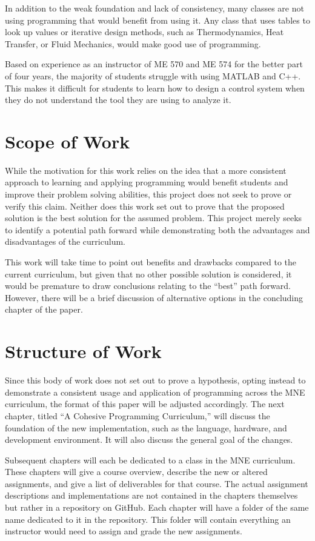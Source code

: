 In addition to the weak foundation and lack of consistency, many classes are not using
programming that would benefit from using it. Any class that uses tables to look up values
or iterative design methods, such as Thermodynamics, Heat Transfer, or Fluid Mechanics, 
would make good use of programming. 

Based on experience as an instructor of ME 570 and ME 574 for the better part of 
four years, the majority of students struggle with using MATLAB and C++. This makes it 
difficult for students to learn how to design a control system when they do not understand 
the tool they are using to analyze it.

\section{Scope of Work}

While the motivation for this work relies on the idea that a more consistent approach to
learning and applying programming would benefit students and improve their problem solving
abilities, this project does not seek to prove or verify this claim. Neither does this
work set out to prove that the proposed solution is the best solution for the assumed
problem. This project merely seeks to identify a potential path forward while 
demonstrating both the advantages and disadvantages of the curriculum. 

This work will take time to point out benefits and drawbacks compared to the current 
curriculum, but given that no other possible solution is considered, it would be
premature to draw conclusions relating to the ``best'' path forward. However, there 
will be a brief discussion of alternative options in the concluding chapter of the paper.

\section{Structure of Work}

Since this body of work does not set out to prove a hypothesis, opting instead to demonstrate
a consistent usage and application of programming across the MNE curriculum, the format of
this paper will be adjusted accordingly. The next chapter, titled ``A Cohesive Programming
Curriculum,'' will discuss the foundation of the new implementation, such as the language,
hardware, and development environment. It will also discuss the general goal of the changes.

Subsequent chapters will each be dedicated to a class in the MNE curriculum. These chapters
will give a course overview, describe the new or altered assignments, and give a list
of deliverables for that course. The actual assignment descriptions and implementations
are not contained in the chapters themselves but rather in a repository on GitHub. Each 
chapter will have a folder of the same name dedicated to it in the repository. This folder
will contain everything an instructor would need to assign and grade the new assignments.
